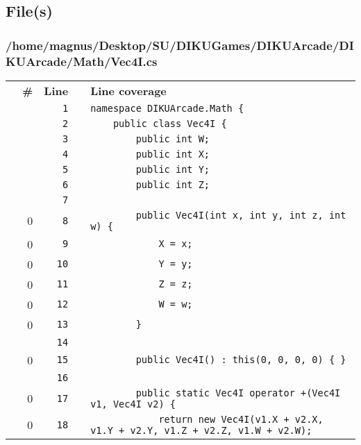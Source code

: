 \documentclass[a4paper,landscape,10pt]{article}
\begin{document}
\subsection{File(s)}
\subsubsection{/home/magnus/Desktop/SU/DIKUGames/DIKUArcade/DIKUArcade/Math/Vec4I.cs}
\begin{longtable}[l]{lrrll}
\textbf{} & \textbf{\#} & \textbf{Line} & \textbf{} & \textbf{Line coverage}\\
\cellcolor{gray} &  & \verb~1~ & & \verb~namespace DIKUArcade.Math {~\\
\cellcolor{gray} &  & \verb~2~ & & \verb~    public class Vec4I {~\\
\cellcolor{gray} &  & \verb~3~ & & \verb~        public int W;~\\
\cellcolor{gray} &  & \verb~4~ & & \verb~        public int X;~\\
\cellcolor{gray} &  & \verb~5~ & & \verb~        public int Y;~\\
\cellcolor{gray} &  & \verb~6~ & & \verb~        public int Z;~\\
\cellcolor{gray} &  & \verb~7~ & & \verb~~\\
\cellcolor{red} & 0 & \verb~8~ & & \verb~        public Vec4I(int x, int y, int z, int w) {~\\
\cellcolor{red} & 0 & \verb~9~ & & \verb~            X = x;~\\
\cellcolor{red} & 0 & \verb~10~ & & \verb~            Y = y;~\\
\cellcolor{red} & 0 & \verb~11~ & & \verb~            Z = z;~\\
\cellcolor{red} & 0 & \verb~12~ & & \verb~            W = w;~\\
\cellcolor{red} & 0 & \verb~13~ & & \verb~        }~\\
\cellcolor{gray} &  & \verb~14~ & & \verb~~\\
\cellcolor{red} & 0 & \verb~15~ & & \verb~        public Vec4I() : this(0, 0, 0, 0) { }~\\
\cellcolor{gray} &  & \verb~16~ & & \verb~~\\
\cellcolor{red} & 0 & \verb~17~ & & \verb~        public static Vec4I operator +(Vec4I v1, Vec4I v2) {~\\
\cellcolor{red} & 0 & \verb~18~ & & \verb~            return new Vec4I(v1.X + v2.X, v1.Y + v2.Y, v1.Z + v2.Z, v1.W + v2.W);~\\

\end{longtable}
\end{document}
